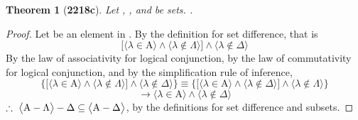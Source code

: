 \documentclass[preview]{standalone}
\newtheorem*{theorem*}{Theorem}
\begin{document}
\begin{theorem*}[\textbf{2218c}] \color{black}
    Let , \bm{$\Lambda$}, and \bm{$\Delta$} be sets. 
    .
\end{theorem*}
\begin{proof} \color{black}
    Let \bm{$\lambda$} be an element in 
    . 
    By the definition for set difference, that is
    \begin{equation*}
        \bigg[
            \Big \langle \lambda \in \mathrm{A} \Big \rangle
                \land
            \Big \langle \lambda \notin \Lambda \Big \rangle
        \bigg]
            \land
        \Big \langle \lambda \notin \Delta \Big \rangle
    \end{equation*}
    By the law of associativity for logical conjunction, 
    by the law of commutativity for logical conjunction,
    and by the simplification rule of inference,
    \begin{equation*}
        \Bigg\{
            \bigg[
                \Big \langle \lambda \in \mathrm{A} \Big \rangle
                    \land
                \Big \langle \lambda \notin \Lambda \Big \rangle
            \bigg]
                \land
            \Big \langle \lambda \notin \Delta \Big \rangle
        \Bigg\}
            \equiv
        \Bigg\{
            \bigg[
                \Big \langle \lambda \in \mathrm{A} \Big \rangle
                    \land
                \Big \langle \lambda \notin \Delta \Big \rangle
            \bigg]
                \land
            \Big \langle \lambda \notin \Lambda \Big \rangle
        \Bigg\}
    \end{equation*}
    \begin{equation*}
            \to
        \Big \langle \lambda \in \mathrm{A} \Big \rangle
            \land
        \Big \langle \lambda \notin \Delta \Big \rangle
    \end{equation*}
    $\therefore \text{\space} \relax{
    \big \langle \mathrm{A} - \Lambda \big \rangle - \Delta 
        \subseteq 
    \big \langle \mathrm{A} - \Delta \big \rangle
    }$,
    by the definitions for set difference and subsets.
\color{lightgray} \end{proof}
\end{document}
